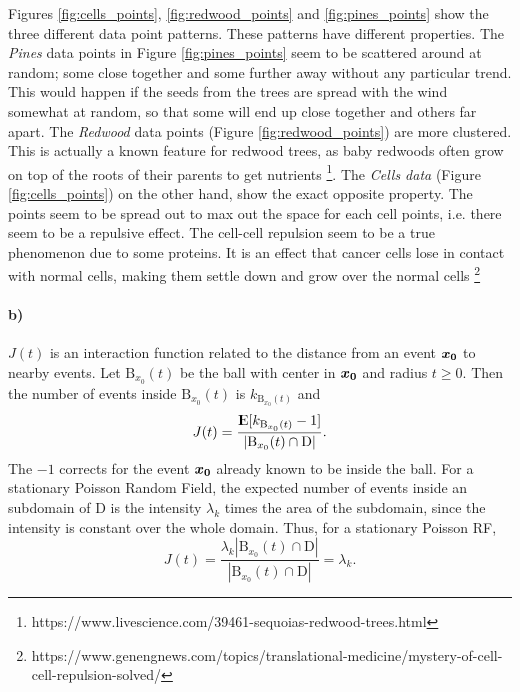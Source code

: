 Figures \ref{fig:cells_points}, \ref{fig:redwood_points} and \ref{fig:pines_points} show the three different data point patterns. These patterns have different properties. The \textit{Pines} data points in Figure \ref{fig:pines_points} seem to be scattered around at random; some close together and some further away without any particular trend. This would happen if the seeds from the trees are spread with the wind somewhat at random, so that some will end up close together and others far apart. The \textit{Redwood} data points (Figure \ref{fig:redwood_points}) are more clustered. This is actually a known feature for redwood trees, as baby redwoods often grow on top of the roots of their parents to get nutrients \footnote{https://www.livescience.com/39461-sequoias-redwood-trees.html}. The \textit{Cells data} (Figure \ref{fig:cells_points}) on the other hand, show the exact opposite property. The points seem to be spread out to max out the space for each cell points, i.e. there seem to be a repulsive effect. The cell-cell repulsion seem to be a true phenomenon due to some proteins. It is an effect that cancer cells lose in contact with normal cells, making them settle down and grow over the normal cells \footnote{https://www.genengnews.com/topics/translational-medicine/mystery-of-cell-cell-repulsion-solved/}

\paragraph{b)}

$J(t)$ is an interaction function related to the distance from an event $\bm{x_0}$ to nearby events. Let $\textrm{B}_{x_0}(t)$ be the ball with center in $\bm{x_0}$ and radius $t \geq 0$. Then the number of events inside $\textrm{B}_{x_0}(t)$ is $k_{\textrm{B}_{x_0}(t)}$ and
\begin{equation}
    J(t) = \frac{{\rm I\kern-.3em E}{[k_{\textrm{B}_{x_0}(t)}-1]}}{|\textrm{B}_{x_0}(t) \cap \textrm{D}|}.
\end{equation}
The $-1$ corrects for the event $\bm{x_0}$ already known to be inside the ball. For a stationary Poisson Random Field, the expected number of events inside an subdomain of D is the intensity $\lambda_k$ times the area of the subdomain, since the intensity is constant over the whole domain. Thus, for a stationary Poisson RF, 
\begin{equation}
    J(t) = \frac{\lambda_k |\textrm{B}_{x_0}(t) \cap \textrm{D}|}{|\textrm{B}_{x_0}(t) \cap \textrm{D}|} = \lambda_k.
\end{equation}

